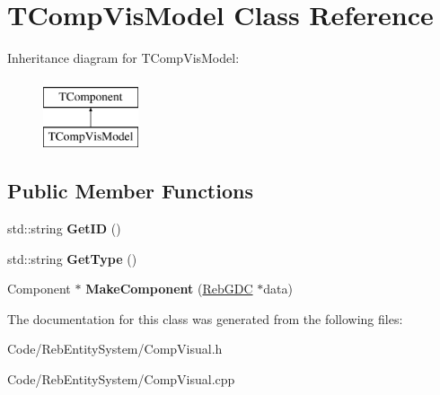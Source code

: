 \hypertarget{class_t_comp_vis_model}{}\section{T\+Comp\+Vis\+Model Class Reference}
\label{class_t_comp_vis_model}
Inheritance diagram for T\+Comp\+Vis\+Model\+:\begin{figure}[H]
\begin{center}
\leavevmode
\includegraphics[height=2.000000cm]{class_t_comp_vis_model}
\end{center}
\end{figure}
\subsection*{Public Member Functions}
\begin{DoxyCompactItemize}
\item 
std\+::string {\bfseries Get\+ID} ()\hypertarget{class_t_comp_vis_model_a0ddfb5a3aa3b0a0a1abbb7f164156f14}{}\label{class_t_comp_vis_model_a0ddfb5a3aa3b0a0a1abbb7f164156f14}

\item 
std\+::string {\bfseries Get\+Type} ()\hypertarget{class_t_comp_vis_model_a1067e0be18e0cd0620aab0f771d37594}{}\label{class_t_comp_vis_model_a1067e0be18e0cd0620aab0f771d37594}

\item 
Component $\ast$ {\bfseries Make\+Component} (\hyperlink{class_reb_g_d_c}{Reb\+G\+DC} $\ast$data)\hypertarget{class_t_comp_vis_model_a83177b9cd46a79ca1eb5e33880a9563d}{}\label{class_t_comp_vis_model_a83177b9cd46a79ca1eb5e33880a9563d}

\end{DoxyCompactItemize}


The documentation for this class was generated from the following files\+:\begin{DoxyCompactItemize}
\item 
Code/\+Reb\+Entity\+System/Comp\+Visual.\+h\item 
Code/\+Reb\+Entity\+System/Comp\+Visual.\+cpp\end{DoxyCompactItemize}
